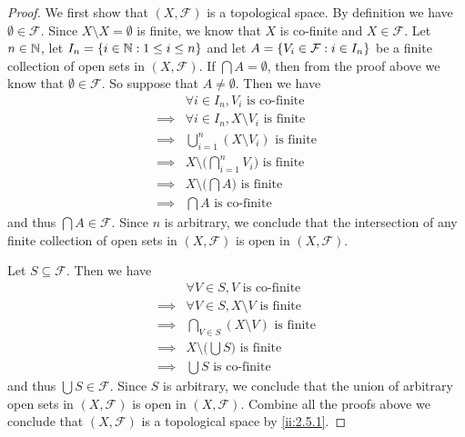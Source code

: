 \begin{proof}
  We first show that \((X, \mathcal{F})\) is a topological space.
  By definition we have \(\emptyset \in \mathcal{F}\).
  Since \(X \setminus X = \emptyset\) is finite, we know that \(X\) is co-finite and \(X \in \mathcal{F}\).
  Let \(n \in \mathbb{N}\), let \(I_n = \left\lbrace i \in \mathbb{N} : 1 \leq i \leq n\right\rbrace\) and let \(A = \left\lbrace V_i \in \mathcal{F} : i \in I_n\right\rbrace\) be a finite collection of open sets in \((X, \mathcal{F})\).
  If \(\bigcap A = \emptyset\), then from the proof above we know that \(\emptyset \in \mathcal{F}\).
  So suppose that \(A \neq \emptyset\).
  Then we have
  \begin{align*}
             & \forall i \in I_n, V_i \text{ is co-finite}                     \\
    \implies & \forall i \in I_n, X \setminus V_i \text{ is finite}            \\
    \implies & \bigcup_{i = 1}^n (X \setminus V_i) \text{ is finite}           \\
    \implies & X \setminus \bigg(\bigcap_{i = 1}^n V_i\bigg) \text{ is finite} \\
    \implies & X \setminus \bigg(\bigcap A\bigg) \text{ is finite}             \\
    \implies & \bigcap A \text{ is co-finite}
  \end{align*}
  and thus \(\bigcap A \in \mathcal{F}\).
  Since \(n\) is arbitrary, we conclude that the intersection of any finite collection of open sets in \((X, \mathcal{F})\) is open in \((X, \mathcal{F})\).

  Let \(S \subseteq \mathcal{F}\).
  Then we have
  \begin{align*}
             & \forall V \in S, V \text{ is co-finite}             \\
    \implies & \forall V \in S, X \setminus V \text{ is finite}    \\
    \implies & \bigcap_{V \in S} (X \setminus V) \text{ is finite} \\
    \implies & X \setminus \bigg(\bigcup S\bigg) \text{ is finite} \\
    \implies & \bigcup S \text{ is co-finite}
  \end{align*}
  and thus \(\bigcup S \in \mathcal{F}\).
  Since \(S\) is arbitrary, we conclude that the union of arbitrary open sets in \((X, \mathcal{F})\) is open in \((X, \mathcal{F})\).
  Combine all the proofs above we conclude that \((X, \mathcal{F})\) is a topological space by \cref{ii:2.5.1}.


\end{proof}

